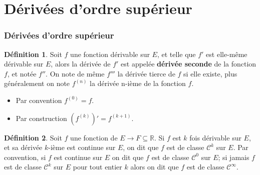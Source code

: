 \documentclass[10pt,notheorems]{beamer}
\theoremstyle{plain}
\theoremstyle{definition} %
\newtheorem{definition}{Définition}
\begin{document}
\section{Dérivées d'ordre supérieur}

\begin{frame}
  \frametitle{Dérivées d'ordre supérieur}
  \hypertarget{slide_derivees_ordre_n_1}{}

  \begin{definition}
    Soit $f$ une fonction dérivable sur $E$, et telle que $f'$ est elle-même dérivable sur $E$, alors la dérivée de $f'$ est appelée \textbf{dérivée seconde} de la fonction $f$, et notée $f''$. On note de même $f'''$ la dérivée tierce de $f$ si elle existe, plus généralement on note $f^{(n)}$ la dérivée n-ième de la fonction $f$.
  \end{definition}

  \bigskip

  \begin{itemize}
  \item Par convention $f^{(0)} = f$.\newline
  \item Par construction $\left(f^{(k)}\right)' = f^{(k+1)}$.\newline
  \end{itemize}


  \begin{definition}
    Soit $f$ une fonction de $E\rightarrow F\subseteq \mathbb R$. Si $f$ est $k$ fois dérivable sur $E$, et sa dérivée $k$-ième est continue sur $E$, on dit que $f$ est de classe $\mathcal C^k$ sur $E$. Par convention, si $f$ est continue sur $E$ on dit que $f$ est de classe $\mathcal C^0$ sur $E$; si jamais $f$ est de classe $\mathcal C^k$ sur $E$ pour tout entier $k$ alors on dit que $f$ est de classe $\mathcal C^{\infty}$.
  \end{definition}

\end{frame}
\end{document}
